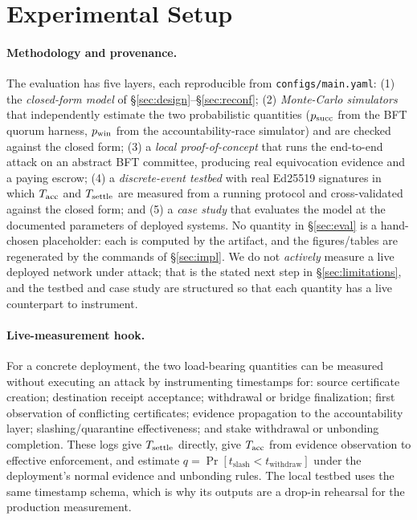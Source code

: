 \section{Experimental Setup}
\label{sec:setup}

\paragraph{Methodology and provenance.}
The evaluation has five layers, each reproducible from \texttt{configs/main.yaml}:
(1) the \emph{closed-form model} of \S\ref{sec:design}--\S\ref{sec:reconf};
(2) \emph{Monte-Carlo simulators} that independently estimate the two probabilistic quantities
($p_{\mathrm{succ}}$ from the BFT quorum harness, $p_{\mathrm{win}}$ from the accountability-race simulator) and are checked
against the closed form;
(3) a \emph{local proof-of-concept} that runs the end-to-end attack on an abstract BFT committee,
producing real equivocation evidence and a paying escrow;
(4) a \emph{discrete-event testbed} with real Ed25519 signatures in which $T_{\mathrm{acc}}$ and $T_{\mathrm{settle}}$ are
measured from a running protocol and cross-validated against the closed form; and
(5) a \emph{case study} that evaluates the model at the documented parameters of deployed systems. No
quantity in \S\ref{sec:eval} is a hand-chosen placeholder: each is computed by the artifact, and the
figures/tables are regenerated by the commands of \S\ref{sec:impl}. We do not \emph{actively} measure
a live deployed network under attack; that is the stated next step in \S\ref{sec:limitations}, and the
testbed and case study are structured so that each quantity has a live counterpart to instrument.

\paragraph{Live-measurement hook.}
For a concrete deployment, the two load-bearing quantities can be measured without executing an
attack by instrumenting timestamps for: source certificate creation; destination receipt acceptance;
withdrawal or bridge finalization; first observation of conflicting certificates; evidence
propagation to the accountability layer; slashing/quarantine effectiveness; and stake withdrawal or
unbonding completion. These logs give $T_{\mathrm{settle}}$ directly, give $T_{\mathrm{acc}}$ from evidence observation to
effective enforcement, and estimate
$q=\Pr[t_{\mathrm{slash}}<t_{\mathrm{withdraw}}]$ under the deployment's normal evidence and
unbonding rules. The local testbed uses the same timestamp schema, which is why its outputs are a
drop-in rehearsal for the production measurement.

